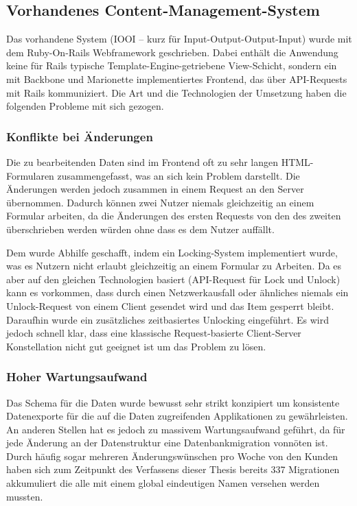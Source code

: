 \subsection{Vorhandenes Content-Management-System}
\label{ssec:ep_vorhandenes_content_management_system}

Das vorhandene System (IOOI -- kurz für Input-Output-Output-Input) wurde mit
dem Ruby-On-Rails Webframework geschrieben.  Dabei enthält die Anwendung keine
für Rails typische Template-Engine-getriebene View-Schicht, sondern ein mit
Backbone und Marionette \cite{marionette} implementiertes Frontend, das über
API-Requests mit Rails kommuniziert.  Die Art und die Technologien der Umsetzung
haben die folgenden Probleme mit sich gezogen.

\subsubsection{Konflikte bei Änderungen}
\label{sssec:epv_konflikte_bei_aenderungen}

Die zu bearbeitenden Daten sind im Frontend oft zu sehr langen HTML-Formularen
zusammengefasst, was an sich kein Problem darstellt.  Die Änderungen werden
jedoch zusammen in einem Request an den Server übernommen.  Dadurch können
zwei Nutzer niemals gleichzeitig an einem Formular arbeiten, da die Änderungen
des ersten Requests von den des zweiten überschrieben werden würden ohne dass
es dem Nutzer auffällt.

Dem wurde Abhilfe geschafft, indem ein Locking-System implementiert wurde, was
es Nutzern nicht erlaubt gleichzeitig an einem Formular zu Arbeiten.  Da es
aber auf den gleichen Technologien basiert (API-Request für Lock und Unlock)
kann es vorkommen, dass durch einen Netzwerkausfall oder ähnliches niemals ein
Unlock-Request von einem Client gesendet wird und das Item gesperrt bleibt.
Daraufhin wurde ein zusätzliches zeitbasiertes Unlocking eingeführt.  Es wird
jedoch schnell klar, dass eine klassische Request-basierte Client-Server
Konstellation nicht gut geeignet ist um das Problem zu lösen.

\subsubsection{Hoher Wartungsaufwand}
\label{sssec:epv_hoher_wartungsaufwand}

Das Schema für die Daten wurde bewusst sehr strikt konzipiert um konsistente
Datenexporte für die auf die Daten zugreifenden Applikationen zu gewährleisten.
An anderen Stellen hat es jedoch zu massivem Wartungsaufwand geführt, da für
jede Änderung an der Datenstruktur eine Datenbankmigration vonnöten ist.
Durch häufig sogar mehreren Änderungswünschen pro Woche von den Kunden haben
sich zum Zeitpunkt des Verfassens dieser Thesis bereits 337 Migrationen
akkumuliert die alle mit einem global eindeutigen Namen versehen werden mussten.

